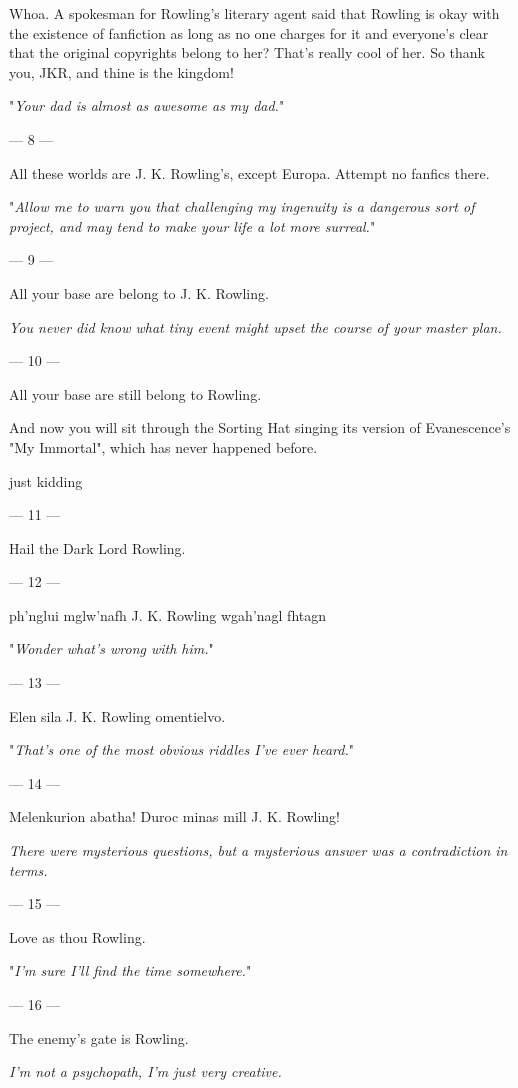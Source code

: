 {{Whoa. A spokesman
for Rowling's literary agent said that Rowling is okay with the existence of
fanfiction as long as no one charges for it and everyone's clear that the
original copyrights belong to her? That's really cool of her. So thank you,
JKR, and thine is the kingdom!

"\emph{Your dad is almost as awesome as my dad.}"

--- 8 ---

All these worlds
are J. K. Rowling's, except Europa. Attempt no fanfics there.

"\emph{Allow me to warn you that challenging my ingenuity is a dangerous sort
of project, and may tend to make your life a lot more surreal.}"

--- 9 ---

All your base are
belong to J. K. Rowling.

\emph{You never did know what tiny event might upset the course of your master
plan.}

--- 10 ---

All your base are
still belong to Rowling.

And now you will sit through the Sorting Hat singing its version of
Evanescence's "My Immortal", which has never happened before.

just kidding

--- 11 ---

Hail the Dark Lord Rowling.

--- 12 ---

ph'nglui mglw'nafh J. K. Rowling wgah'nagl fhtagn

"\emph{Wonder what's wrong with \emph{him}.}"

--- 13 ---

Elen sila J. K. Rowling omentielvo.

"\emph{That's one of the most obvious riddles I've ever heard.}"

--- 14 ---

Melenkurion abatha! Duroc minas mill J. K. Rowling!

\emph{There were mysterious questions, but a mysterious answer was a
contradiction in terms.}

--- 15 ---

Love as thou Rowling.

"\emph{I'm sure I'll find the time somewhere.}"

--- 16 ---

The enemy's gate is Rowling.

\emph{I'm not a psychopath, I'm just very creative.}

}}
